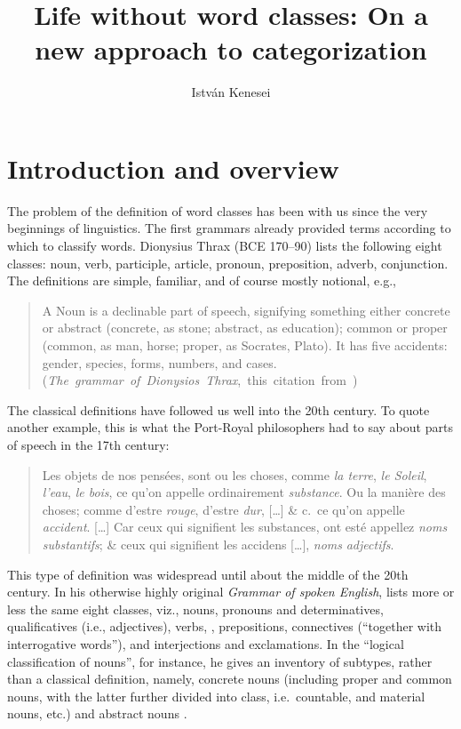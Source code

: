 \documentclass[output=paper]{langsci/langscibook}
\author{István Kenesei\affiliation{Research Institute for Linguistics,
Budapest, \& University of Szeged}}
\title{Life without word classes: On a new approach to categorization}
\begin{document}
\glsresetall

\section{Introduction and overview}\label{sec:27.1}

The problem of the definition of word classes has been with us since the very
beginnings of linguistics. The first grammars already provided terms according
to which to classify words. Dionysius Thrax (BCE 170--90) lists the following
eight classes: noun, verb, participle, article, pronoun, preposition, adverb,
conjunction. The definitions are simple, familiar, and of course mostly
notional, e.g., 

\begin{quote}
A Noun is a declinable part of speech, signifying something
either concrete or abstract (concrete, as stone; abstract, as education);
common or proper (common, as man, horse; proper, as Socrates, Plato). It has
five accidents: gender, species, forms, numbers, and cases.\\
\hbox{}\hfill\hbox{(\emph{The grammar of Dionysios Thrax}, this citation from \citealt[331]{Davidson1874})}
\end{quote} 
The classical definitions have followed us well into the 20th century. To
quote another example, this is what the Port-Royal philosophers had to say
about parts of speech in the 17th century:

\begin{quote}
Les objets de nos pensées, sont ou les choses, comme \emph{la terre}, \emph{le Soleil},
\emph{l’eau}, \emph{le bois}, ce qu’on appelle ordinairement
\emph{substance}. Ou la manière des choses; comme d’estre \emph{rouge},
d’estre \emph{dur}, [\dots] \& c.\ ce qu’on appelle \emph{accident}. [\dots] Car
ceux qui signifient les substances, ont esté appellez \emph{noms substantifs}; 
\& ceux qui signifient les accidens [\dots], \emph{noms} \emph{adjectifs}.\\
    \hbox{}\hfill\hbox{\parencite[30--31]{LancelotArnauld1660}}
\end{quote}

This type of definition was widespread until about the middle of the 20th
century. In his otherwise highly original \emph{Grammar of spoken English},
\citet{Palmer1924} lists more or less the same eight classes, viz., nouns,
pronouns and determinatives, qualificatives (i.e., adjectives), verbs, ,
prepositions, connectives (“together with interrogative words”), and
interjections and exclamations. In the “logical classification of nouns”, for
instance, he gives an inventory of subtypes, rather than a classical
definition, namely, concrete nouns (including proper and common nouns, with the
latter further divided into class, i.e.\ countable, and material nouns, etc.)
and abstract nouns \citep[28--32]{Palmer1924}.
\end{document}
